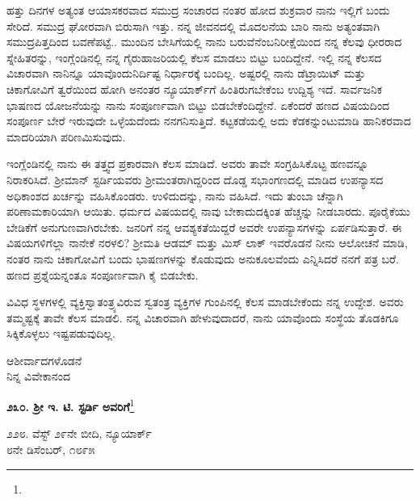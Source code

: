 ಹತ್ತು ದಿನಗಳ ಅತ್ಯಂತ ಆಯಾಸಕರವಾದ ಸಮುದ್ರ ಸಂಚಾರದ ನಂತರ ಹೋದ ಶುಕ್ರವಾರ ನಾನು ಇಲ್ಲಿಗೆ ಬಂದು ಸೇರಿದೆ. ಸಮುದ್ರ ಘೋರವಾಗಿ ಬಿರುಸಾಗಿ ಇತ್ತು. ನನ್ನ ಜೀವನದಲ್ಲಿ ಮೊದಲನೆಯ ಬಾರಿ ನಾನು ಅತ್ಯಂತವಾಗಿ ಸಮುದ್ರಪಿತ್ತದಿಂದ ಬವಣೆಪಟ್ಟೆ.. ಮುಂದಿನ ಬೇಸಿಗೆಯಲ್ಲಿ ನಾನು ಬರುವೆನೆಂಬನಿರೀಕ್ಷೆಯಿಂದ ನನ್ನ ಕೆಲವು ಧೀರರಾದ ಸ್ನೇಹಿತರನ್ನು, ಇಂಗ್ಲೆಂಡಿನಲ್ಲಿ ನನ್ನ ಗೈರುಹಾಜರಿಯಲ್ಲಿ ಕೆಲಸ ಮಾಡಲು ಬಿಟ್ಟು ಬಂದಿದ್ದೇನೆ. ಇಲ್ಲಿ ನನ್ನ ಕೆಲಸದ ವಿಚಾರವಾಗಿ ನಾನಿನ್ನೂ ಯಾವೊಂದುನಿರ್ದಿಷ್ಟ ನಿರ್ಧಾರಕ್ಕೆ ಬಂದಿಲ್ಲ. ಅಷ್ಟರಲ್ಲಿ ನಾನು ಡೆಟ್ರಾಯಿಟ್ ಮತ್ತು ಚಿಕಾಗೋವಿಗೆ ತ್ವರೆಯಿಂದ ಹೋಗಿ ಅನಂತರ ನ್ಯೂಯಾರ್ಕ್‌ಗೆ ಹಿಂತಿರುಗಬೇಕೆಂಬ ಉದ್ದಿಶ್ಯ ಇದೆ. ಸಾರ್ವಜನಿಕ ಭಾಷಣದ ಯೋಜನೆಯನ್ನು ನಾನು ಸಂಪೂರ್ಣವಾಗಿ ಬಿಟ್ಟು ಬಿಡಬೇಕೆಂದಿದ್ದೇನೆ. ಏಕೆಂದರೆ ಹಣದ ವಿಷಯದಿಂದ ಸಂಪೂರ್ಣ ಬೇರೆ ಇರುವುದೇ ಒಳ್ಳೆಯದೆಂದು ನನಗನಿಸುತ್ತಿದೆ. ಕಟ್ಟಕಡೆಯಲ್ಲಿ ಅದು ಕೆಡಕನ್ನುಂಟುಮಾಡಿ ಹಾನಿಕರವಾದ ಮಾದರಿಯಾಗಿ ಪರಿಣಮಿಸುವುದು.

ಇಂಗ್ಲೆಂಡಿನಲ್ಲಿ ನಾನು ಈ ತತ್ತ್ವದ ಪ್ರಕಾರವಾಗಿ ಕೆಲಸ ಮಾಡಿದೆ. ಅವರು ತಾವೇ ಸಂಗ್ರಹಿಸಿಕೊಟ್ಟ ಹಣವನ್ನೂ ನಿರಾಕರಿಸಿದೆ. ಶ‍್ರೀಮಾನ್ ಸ್ಟರ್ಡಿಯವರು ಶ‍್ರೀಮಂತರಾಗಿದ್ದ\break ರಿಂದ ದೊಡ್ಡ ಸಭಾಂಗಣದಲ್ಲಿ ಮಾಡಿದ ಉಪನ್ಯಾಸದ ಅಧಿಕಾಂಶದ ಖರ್ಚನ್ನು ವಹಿಸಿಕೊಂಡರು. ಉಳಿದುದನ್ನು, ನಾನು ವಹಿಸಿದೆ. ಇದು ತುಂಬಾ ಚೆನ್ನಾಗಿ ಪರಿಣಾಮಕಾರಿಯಾಗಿ ಆಯಿತು. ಧರ್ಮದ ವಿಷಯದಲ್ಲಿ ನಾವು ಬೇಕಾದುದಕ್ಕಿಂತ ಹೆಚ್ಚನ್ನು ನೀಡಬಾರದು. ಪೂರೈಕೆಯು ಬೇಡಿಕೆಗೆ ಅನುಗುಣವಾಗಿರಬೇಕು. ಜನರಿಗೆ ನನ್ನ ಆವಶ್ಯಕತೆಯಿದ್ದರೆ ಅವರೇ ಉಪನ್ಯಾಸಗಳನ್ನು ಏರ್ಪಡಿಸುತ್ತಾರೆ. ಈ ವಿಷಯಗಳಿಗೆಲ್ಲಾ ನಾನೇಕೆ ನರಳಲಿ? ಶ‍್ರೀಮತಿ ಆಡಮ್ ಮತ್ತು ಮಿಸ್ ಲಾಕ್ ಇವರೊಡನೆ ನೀನು ಆಲೋಚನೆ ಮಾಡಿ, ನಂತರ ನಾನು ಚಿಕಾಗೋವಿಗೆ ಬಂದು ಭಾಷಣಗಳನ್ನು ಕೊಡುವುದು ಅನುಕೂಲವೆಂದು ಎನ್ನಿಸಿದರೆ ನನಗೆ ಪತ್ರ ಬರೆ. ಹಣದ ಪ್ರಶ್ನೆಯನ್ನಂತೂ ಸಂಪೂರ್ಣವಾಗಿ ಕೈ ಬಿಡಬೇಕು.

ವಿವಿಧ ಸ್ಥಳಗಳಲ್ಲಿ ವ್ಯಕ್ತಿಸ್ವಾತಂತ್ರ್ಯವಿರುವ ಸ್ವತಂತ್ರ ವ್ಯಕ್ತಿಗಳ ಗುಂಪಿನಲ್ಲಿ ಕೆಲಸ ಮಾಡಬೇಕೆಂದು ನನ್ನ ಉದ್ದೇಶ. ಅವರು ತಮ್ಮಷ್ಟಕ್ಕೆ ತಾವೇ ಕೆಲಸ ಮಾಡಲಿ. ನನ್ನ ವಿಚಾರವಾಗಿ ಹೇಳುವುದಾದರೆ, ನಾನು ಯಾವೊಂದು ಸಂಸ್ಥೆಯ ತೊಡಕಿಗೂ ಸಿಕ್ಕಿಕೊಳ್ಳಲು ಇಷ್ಟಪಡುವುದಿಲ್ಲ.

\vspace{-0.5cm}

{\flushright
ಆಶೀರ್ವಾದಗಳೊಡನೆ\\ನಿನ್ನ ವಿವೇಕಾನಂದ\par}

\begin{center}
\textbf{೨೩೦. ಶ‍್ರೀ ಇ. ಟಿ. ಸ್ಟರ್ಡಿ ಅವರಿಗೆ}\footnote{}
\end{center}

\vspace{-0.5cm}

\begin{flushright}
೨೨೮. ವೆಸ್ಟ್ ೨೯ನೇ ಬೀದಿ, ನ್ಯೂಯಾರ್ಕ್\\೮ನೇ ಡಿಸೆಂಬರ್, ೧೮೯೫
\end{flushright}

\vspace{-0.3cm}

